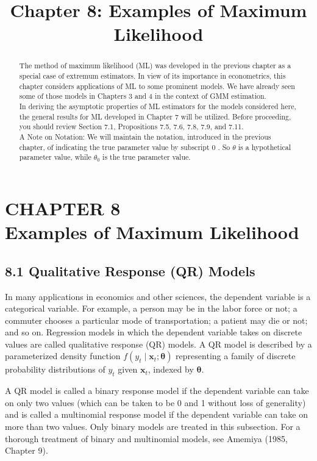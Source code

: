 \documentclass[10pt]{article}
\title{Chapter 8: Examples of Maximum Likelihood}
\author{}
\date{}
\begin{document}
\maketitle

\section*{CHAPTER 8 \\
 Examples of Maximum Likelihood }
\begin{abstract}
The method of maximum likelihood (ML) was developed in the previous chapter as a special case of extremum estimators. In view of its importance in econometrics, this chapter considers applications of ML to some prominent models. We have already seen some of those models in Chapters 3 and 4 in the context of GMM estimation.\\
In deriving the asymptotic properties of ML estimators for the models considered here, the general results for ML developed in Chapter 7 will be utilized. Before proceeding, you should review Section 7.1, Propositions 7.5, 7.6, 7.8, 7.9, and 7.11.\\
A Note on Notation: We will maintain the notation, introduced in the previous chapter, of indicating the true parameter value by subscript 0 . So $\theta$ is a hypothetical parameter value, while $\theta_{0}$ is the true parameter value.
\end{abstract}

\subsection*{8.1 Qualitative Response (QR) Models}
In many applications in economics and other sciences, the dependent variable is a categorical variable. For example, a person may be in the labor force or not; a commuter chooses a particular mode of transportation; a patient may die or not; and so on. Regression models in which the dependent variable takes on discrete values are called qualitative response (QR) models. A QR model is described by a parameterized density function $f\left(y_{t} \mid \mathbf{x}_{t} ; \boldsymbol{\theta}\right)$ representing a family of discrete probability distributions of $y_{t}$ given $\mathbf{x}_{t}$, indexed by $\boldsymbol{\theta}$.

A QR model is called a binary response model if the dependent variable can take on only two values (which can be taken to be 0 and 1 without loss of generality) and is called a multinomial response model if the dependent variable can take on more than two values. Only binary models are treated in this subsection. For a thorough treatment of binary and multinomial models, see Amemiya (1985, Chapter 9).
\end{document}
